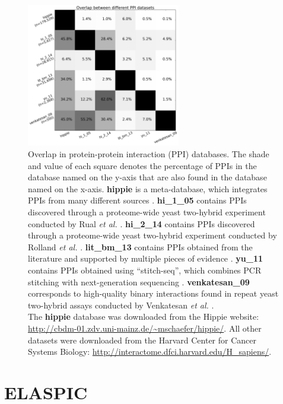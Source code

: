 \begin{figure}[!tb]
	\centering
	\includegraphics[width=0.6\textwidth]{static/profs/ppi_database_overlap.png}
	\caption[Overlap in protein-protein interaction databases.]{Overlap in protein-protein interaction (PPI) databases. The shade and value of each square denotes the percentage of PPIs in the database named on the y-axis that are also found in the database named on the x-axis. \textbf{hippie} is a meta-database, which integrates PPIs from many different sources \cite{schaefer_hippie:_2012}. \textbf{hi\_1\_05} contains PPIs discovered through a proteome-wide yeast two-hybrid experiment conducted by Rual \textit{et al.} \cite{rual_towards_2005}. \textbf{hi\_2\_14} contains PPIs discovered through a proteome-wide yeast two-hybrid experiment conducted by Rolland \textit{et al.} \cite{rolland_proteome-scale_2014}. \textbf{lit\_bm\_13} contains PPIs obtained from the literature and supported by multiple pieces of evidence \cite{rolland_proteome-scale_2014}. \textbf{yu\_11} contains PPIs obtained using ``stitch-seq'', which combines PCR stitching with next-generation sequencing \cite{yu_next-generation_2011}. \textbf{venkatesan\_09} corresponds to high-quality binary interactions found in repeat yeast two-hybrid assays conducted by Venkatesan \textit{et al.} \cite{venkatesan_empirical_2009}. \\
	The \textbf{hippie} database was downloaded from the Hippie website: \url{http://cbdm-01.zdv.uni-mainz.de/~mschaefer/hippie/}. All other datasets were downloaded from the Harvard Center for Cancer Systems Biology: \url{http://interactome.dfci.harvard.edu/H_sapiens/}.}
	\label{fig:ppi_database_overlap}
\end{figure}



\clearpage
\section{ELASPIC} \label{sec:elaspic}

